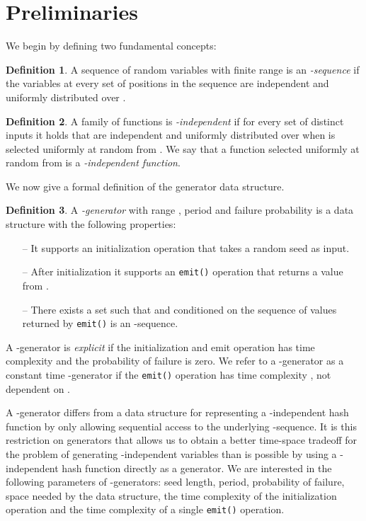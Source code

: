 \documentclass[a4paper,11pt]{article}
\theoremstyle{plain}
\theoremstyle{definition}
\newtheorem{definition}{Definition}
\begin{document}
\section{Preliminaries} \label{sec:preliminaries}
We begin by defining two fundamental concepts:
\begin{definition}
A sequence  of  random variables with finite range  is an \emph{-sequence} if the variables at every set of  positions in the sequence are independent and uniformly distributed over . 
\end{definition}
\begin{definition}
A family of functions  is \emph{-independent} if for every set of  distinct inputs  
it holds that  are independent and uniformly distributed over  when  is selected uniformly at random from . 
We say that a function  selected uniformly at random from  is a \emph{-independent function}.
\end{definition}
We now give a formal definition of the generator data structure. 
\begin{definition}
A \emph{-generator} with range , period  and failure probability  is a data structure with the following properties:
\begin{itemize}
\item[--] It supports an initialization operation that takes a random seed  as input.
\item[--] After initialization it supports an \texttt{emit()} operation that returns a value from . 
\item[--] There exists a set  such that  and conditioned on  the sequence  of values returned by \texttt{emit()} is an -sequence. 
\end{itemize}
A -generator is \emph{explicit} if the initialization and emit operation has time complexity  and the probability of failure is zero. 
We refer to a -generator as a constant time -generator if the \texttt{emit()} operation has time complexity , not dependent on .
\end{definition}

A -generator differs from a data structure for representing a -independent hash function by only allowing sequential access to the underlying -sequence. 
It is this restriction on generators that allows us to obtain a better time-space tradeoff for the problem of generating -independent variables than is possible by using a -independent hash function directly as a generator.  
We are interested in the following parameters of -generators: seed length, period, probability of failure, space needed by the data structure, the time complexity of the initialization operation and the time complexity of a single \texttt{emit()} operation.
\end{document}
